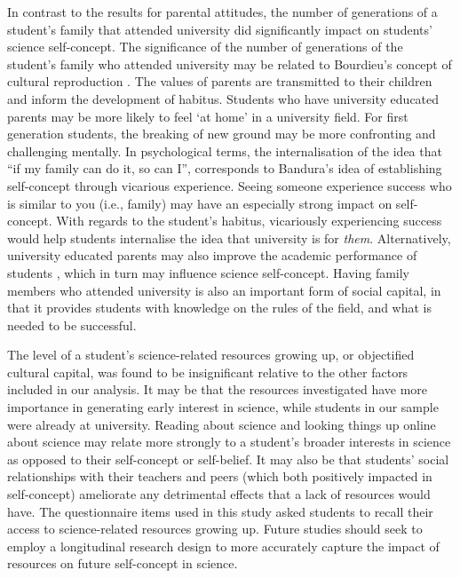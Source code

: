 \documentclass[smallextended]{svjour3}       %
\begin{document}
In contrast to the results for parental attitudes, the number of generations of a student's family that attended university did significantly impact on students' science self-concept. The significance of the number of generations of the student's family who attended university may be related to Bourdieu's concept of cultural reproduction \cite{Dimaggio1982}. The values of parents are transmitted to their children and inform the development of habitus. Students who have university educated parents may be more likely to feel `at home' in a university field. For first generation students, the breaking of new ground may be more confronting and challenging mentally. In psychological terms, the internalisation of the idea that ``if my family can do it, so can I'', corresponds to Bandura's \citeyear{bandura1986explanatory} idea of establishing self-concept through vicarious experience. Seeing someone experience success who is similar to you (i.e., family) may have an especially strong impact on self-concept. With regards to the student's habitus, vicariously experiencing success would help students internalise the idea that university is for \textit{them}. Alternatively, university educated parents may also improve the academic performance of students \cite{paul2011cultural}, which in turn may influence science self-concept. Having family members who attended university is also an important form of social capital, in that it provides students with knowledge on the rules of the field, and what is needed to be successful.

The level of a student's science-related resources growing up, or objectified cultural capital, was found to be insignificant relative to the other factors included in our analysis. It may be that the resources investigated have more importance in generating early interest in science, while students in our sample were already at university. Reading about science and looking things up online about science may relate more strongly to a student's broader interests in science as opposed to their self-concept or self-belief. It may also be that students' social relationships with their teachers and peers (which both positively impacted in self-concept) ameliorate any detrimental effects that a lack of resources would have. The questionnaire items used in this study asked students to recall their access to science-related resources growing up. Future studies should seek to employ a longitudinal research design to more accurately capture the impact of resources on future self-concept in science. 
\end{document}
